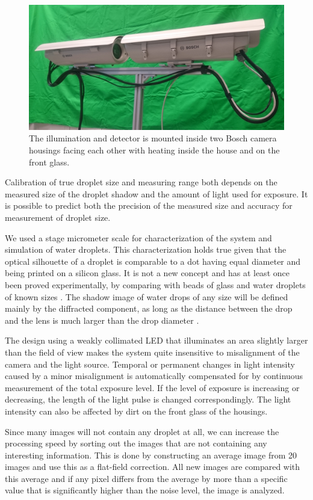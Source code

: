 \begin{figure}[ht]
\centering\includegraphics[width=0.75\linewidth]{figures/cam_housings}
\caption{The illumination and detector is mounted inside two Bosch camera housings facing each other with heating inside the house and on the front glass.}
\end{figure}

Calibration of true droplet size and measuring range both depends on the measured size of the droplet shadow and the amount of light used for exposure. It is possible to predict both the precision of the measured size and accuracy for measurement of droplet size. 

We used a stage micrometer scale for characterization of the system and simulation of water droplets. This characterization holds true given that the optical silhouette of a droplet is comparable to a dot having equal diameter and being printed on a silicon glass. It is not a new concept and has at least once been proved experimentally, by comparing with beads of glass and water droplets of known sizes \cite{koro1991,koro1998}. The shadow image of water drops of any size will be defined mainly by the diffracted component, as long as the distance between the drop and the lens is much larger than the drop diameter \cite{koro1991,wend2013}. 

The design using a weakly collimated LED that illuminates an area slightly larger than the field of view makes the system quite insensitive to misalignment of the camera and the light source. Temporal or permanent changes in light intensity caused by a minor misalignment is automatically compensated for by continuous measurement of the total exposure level. If the level of exposure is increasing or decreasing, the length of the light pulse is changed correspondingly. The light intensity can also be affected by dirt on the front glass of the housings. 

Since many images will not contain any droplet at all, we can increase the processing speed by sorting out the images that are not containing any interesting information. This is done by constructing an average image from 20 images and use this as a flat-field correction. All new images are compared with this average and if any pixel differs from the average by more than a specific value that is significantly higher than the noise level, the image is analyzed.


